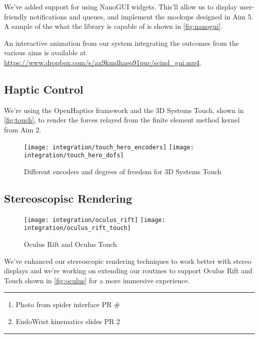 We've added support for  using NanoGUI widgets. This'll allow us to display user-friendly notifications and queues, and implement the mockups designed in Aim 5. A sample of the what the library is capable of is shown in \autoref{fig:nanogui}.

An interactive animation from our system integrating the outcomes from the various aims is available at \url{https://www.dropbox.com/s/ax9kmdhaeq91puc/scind_gui.mp4}.

\subsection{Haptic Control}\label{ssec:haptic}
We're using the OpenHaptics framework and the 3D Systems Touch, shown in \autoref{fig:touch}, to render the forces relayed from the finite element method kernel from Aim 2.

\begin{figure}
  \centering%
  \texttt{[image: integration/touch\_hero\_encoders]}
  \hfill%
  \texttt{[image: integration/touch\_hero\_dofs]}
  \caption{Different encoders and degrees of freedom for 3D Systems Touch}\label{fig:touch}
\end{figure}

\subsection{Stereoscopisc Rendering}\label{ssec:stereo}
\begin{figure}
  \centering%
  \texttt{[image: integration/oculus\_rift]}
  \hfill%
  \texttt{[image: integration/oculus\_rift\_touch]}
  \caption{Oculus Rift and Oculus Touch}\label{fig:oculus}
\end{figure}

We've enhanced our stereoscopic rendering techniques to work better with stereo displays and we're working on extending our routines to support Oculus Rift and Touch shown in \autoref{fig:oculus} for a more immersive experience.

\hrule%

\begin{enumerate}
  \item Photo from spider interface PR \#
  \item EndoWrist kinematics slides PR 2
\end{enumerate}

\hrule%

